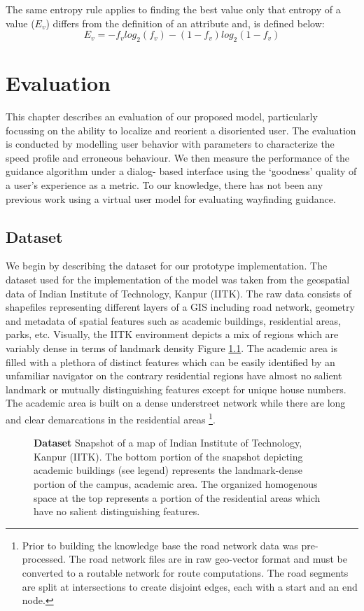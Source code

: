 \documentclass{iitkthesis}
\begin{document}
The same entropy rule applies to finding the best value only that entropy of a value ($E_v$) differs from the definition of an attribute and, is defined below:
\[\displaystyle E_{v} = - f_vlog_{2}{(f_v)} - (1-f_v)log_{2}{(1-f_v)}\] 

 \chapter{Evaluation}
This chapter describes an evaluation of our proposed model, 
particularly focussing on the ability to localize and reorient a 
disoriented user. The evaluation is conducted by modelling user behavior 
with parameters to characterize the speed profile and erroneous behaviour. We 
then measure the performance of the guidance algorithm under a dialog-
based interface using the `goodness' quality of a user's experience as 
a metric. To our knowledge, there has not been any previous work using a 
virtual user model for evaluating wayfinding guidance. 
 
 \label{evaluation}
 \section{Dataset}
We begin by describing the dataset for our prototype implementation. The 
dataset used for the implementation of the model was taken from the 
geospatial data of Indian Institute of Technology, Kanpur (IITK). The raw 
data consists of shapefiles representing different layers of a GIS 
including road network, geometry and metadata of spatial features such as 
academic buildings, residential areas, parks, etc. Visually, the IITK 
environment depicts a mix of regions which are variably dense in terms of 
landmark density Figure \ref{fig:dataset}. The academic 
area is filled with a plethora of distinct features which can be easily 
identified by an unfamiliar navigator on the contrary residential 
regions have almost no salient landmark or mutually distinguishing 
features except for unique house numbers. The 
academic area is built on a dense understreet network while there are long and 
clear demarcations in the residential areas
\footnote{Prior to building the knowledge base the road network data was 
pre-processed. The road network files
are in raw geo-vector format and must be converted to a routable 
network for route computations. The road segments are split at 
intersections to create disjoint edges, each with a start and an end node.}.
\begin{figure}
\centering
{}
\caption{\textbf{\textbf{Dataset}} Snapshot of a map of Indian 
Institute of Technology, Kanpur (IITK). The bottom portion of the snapshot 
depicting academic buildings (see legend) represents the landmark-dense 
portion of the campus, academic area. The organized homogenous space at 
the top represents a portion of the residential areas which have 
no salient distinguishing features.}
\label{fig:dataset}
 \end{figure} 
\end{document}
